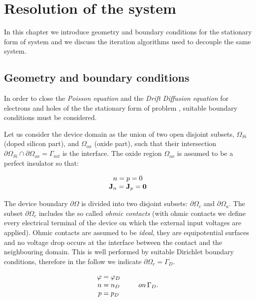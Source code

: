 \chapter{Resolution of the system}

In this chapter we introduce geometry and boundary conditions for the stationary form of system  and we discuss the iteration algorithms used to decouple the same system.

\section{Geometry and boundary conditions}

In order to close the \textit{Poisson equation} and the \textit{Drift Diffusion equation} for electrons and holes of the the stationary form of problem , suitable boundary conditions must be considered.

Let us consider the device domain as the union of two open disjoint subsets, $\Omega_{Si}$ (doped silicon part), and $\Omega_{ox}$ (oxide part), such that their intersection $\partial \Omega_{Si} \cap \partial \Omega_{ox} = \Gamma_{int}$ is the interface. The oxide region $\Omega_{ox}$ is assumed to be a perfect insulator so that:

\begin{equation}
\label{eq: hypotesis oxide}
\begin{array}{c}
n = p = 0 \\
\mathbf{J}_n = \mathbf{J}_p = \mathbf{0}

\end{array}
\end{equation}

The device boundary $\partial \Omega$ is divided into two disjoint subsets: $\partial \Omega_{c}$ and $\partial \Omega_{a}$.
The subset $\partial \Omega_{c}$ includes the so called \textit{ohmic contacts} (with ohmic contacts we define every electrical terminal of the device on which the external input voltages are applied). Ohmic contacts are assumed to be \textit{ideal}, they are equipotential surfaces and no voltage drop occurs at the interface between the contact and the neighbouring domain. This is well performed by suitable Dirichlet boundary conditions, therefore in the follow we indicate $\partial \Omega_{c} = \Gamma_D$.

\begin{equation}
\label{eq: dirichlet boundary condition}
\begin{array}{cc}
\varphi = \varphi_D & \\
n = n_D & \psp{10} on \, \Gamma_D .\\
p = p_D & 
\end{array}
\end{equation}

